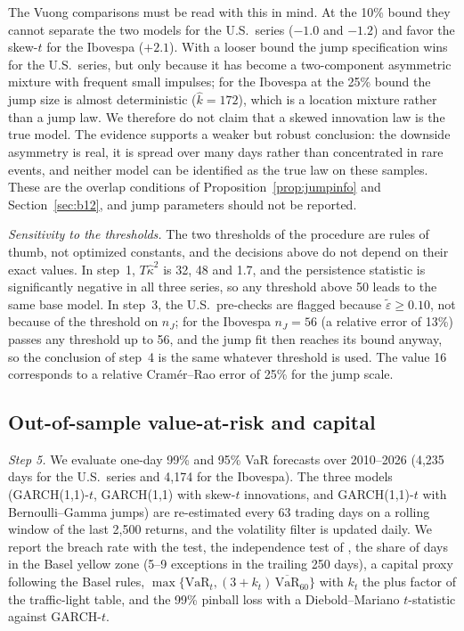 \documentclass[11pt,a4paper]{article}
\theoremstyle{definition}
\theoremstyle{remark}
\begin{document}
The Vuong comparisons must be read with this in mind. At the 10\% bound they cannot separate the two models for the U.S.\ series ($-1.0$ and $-1.2$) and favor the skew-$t$ for the Ibovespa ($+2.1$). With a looser bound the jump specification wins for the U.S.\ series, but only because it has become a two-component asymmetric mixture with frequent small impulses; for the Ibovespa at the 25\% bound the jump size is almost deterministic ($\hat k=172$), which is a location mixture rather than a jump law. We therefore do not claim that a skewed innovation law is the true model. The evidence supports a weaker but robust conclusion: the downside asymmetry is real, it is spread over many days rather than concentrated in rare events, and neither model can be identified as the true law on these samples. These are the overlap conditions of Proposition~\ref{prop:jumpinfo} and Section~\ref{sec:b12}, and jump parameters should not be reported.

\emph{Sensitivity to the thresholds.} The two thresholds of the procedure are rules of thumb, not optimized constants, and the decisions above do not depend on their exact values. In step~1, $T\hat\kappa^2$ is 32, 48 and 1.7, and the persistence statistic is significantly negative in all three series, so any threshold above 50 leads to the same base model. In step~3, the U.S.\ pre-checks are flagged because $\tilde\varepsilon\ge0.10$, not because of the threshold on $n_J$; for the Ibovespa $n_J=56$ (a relative error of 13\%) passes any threshold up to 56, and the jump fit then reaches its bound anyway, so the conclusion of step~4 is the same whatever threshold is used. The value 16 corresponds to a relative Cram\'er--Rao error of 25\% for the jump scale.

\subsection{Out-of-sample value-at-risk and capital}\label{sec:rolling}
\emph{Step 5.} We evaluate one-day 99\% and 95\% VaR forecasts over 2010--2026 (4{,}235 days for the U.S.\ series and 4{,}174 for the Ibovespa). The three models (GARCH(1,1)-$t$, GARCH(1,1) with skew-$t$ innovations, and GARCH(1,1)-$t$ with Bernoulli--Gamma jumps) are re-estimated every 63 trading days on a rolling window of the last 2{,}500 returns, and the volatility filter is updated daily. We report the breach rate with the \citet{kupiec1995} test, the independence test of \citet{christoffersen1998}, the share of days in the Basel yellow zone (5--9 exceptions in the trailing 250 days), a capital proxy following the Basel rules, $\max\{\mathrm{VaR}_t,(3+k_t)\,\overline{\mathrm{VaR}}_{60}\}$ with $k_t$ the plus factor of the traffic-light table, and the 99\% pinball loss with a Diebold--Mariano $t$-statistic against GARCH-$t$.
\end{document}
